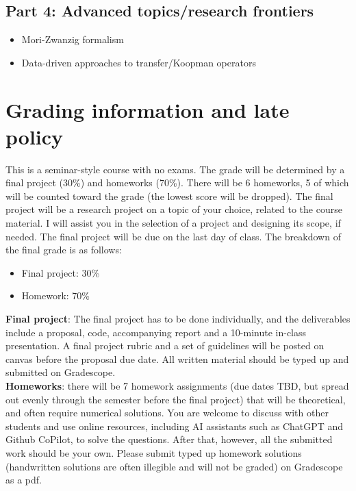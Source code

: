 \documentclass[12pt]{article}
\begin{document}
\subsection*{Part 4: Advanced topics/research frontiers}
\begin{itemize}
	\item Mori-Zwanzig formalism
	\item Data-driven approaches to transfer/Koopman operators
\end{itemize}

\section{Grading information and late policy}

This is a seminar-style course with no exams. The grade will be determined by a final project (30\%) and homeworks (70\%). There will be 6 homeworks, 5 of which will be counted toward the grade (the lowest score will be dropped). The final project will be a research project on a topic of your choice, related to the course material. I will assist you in the selection of a project and designing its scope, if needed. The final project will be due on the last day of class. The breakdown of the final grade is as follows:
\begin{itemize}
	\item Final project: 30\%
	\item Homework: 70\% 
\end{itemize}

\textbf{Final project}: The final project has to be done individually, and the deliverables include a proposal, code, accompanying report and a 10-minute in-class presentation. A final project rubric and a set of guidelines will be posted on canvas before the proposal due date. All written material should be typed up and submitted on Gradescope.\\

\textbf{Homeworks}: there will be 7 homework assignments (due dates TBD, but spread out evenly through the semester before the final project) that will be theoretical, and often require numerical solutions. You are welcome to discuss with other students and use online resources, including AI assistants such as ChatGPT and Github CoPilot, to solve the questions. After that, however, all the submitted work should be your own. Please submit typed up homework solutions (handwritten solutions are often illegible and will not be graded) on Gradescope as a pdf. \\
\end{document}
